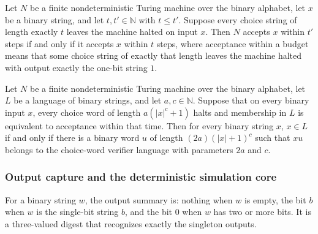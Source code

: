 \begin{lemma}
\label{Complexity.acceptsWithin_iff_of_halts}
\leanok
{}
Let $N$ be a finite nondeterministic Turing machine over the binary alphabet, let $x$ be
a binary string, and let $t,t'\in\mathbb{N}$ with $t\le t'$. Suppose every choice string
of length exactly $t$ leaves the machine halted on input $x$. Then $N$ accepts $x$
within $t'$ steps if and only if it accepts $x$ within $t$ steps, where acceptance
within a budget means that some choice string of exactly that length leaves the machine
halted with output exactly the one-bit string $1$.
\end{lemma}

\begin{lemma}
\label{Complexity.choice_certificate_iff}
\leanok
{}
Let $N$ be a finite nondeterministic Turing machine over the binary alphabet, let $L$ be
a language of binary strings, and let $a,c\in\mathbb{N}$. Suppose that on every binary
input $x$, every choice word of length $a(|x|^c+1)$ halts and membership in $L$ is
equivalent to acceptance within that time. Then for every binary string $x$, $x\in L$ if
and only if there is a binary word $u$ of length $(2a)(|x|+1)^c$ such that $xu$ belongs
to the choice-word verifier language with parameters $2a$ and $c$.
\end{lemma}

\subsubsection{Output capture and the deterministic simulation core}

\begin{definition}
\label{Complexity.capturedSummary}
\leanok
For a binary string $w$, the output summary is: nothing when $w$ is empty, the bit $b$ when $w$ is the single-bit string $b$, and the bit $0$ when $w$ has two or more bits. It is a three-valued digest that recognizes exactly the singleton outputs.
\end{definition}

